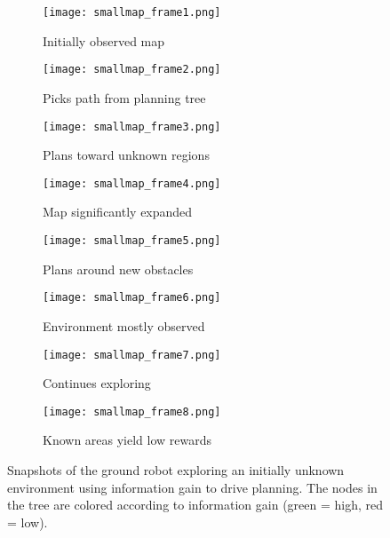 \begin{figure*}[t]
  \centering
	\begin{subfigure}{0.24\textwidth}
	\centering
	\texttt{[image: smallmap\_frame1.png]}
	\caption{Initially observed map\label{fig:smallmap_frame1}}
	\end{subfigure}
	\begin{subfigure}{0.24\textwidth}
	\centering
	\texttt{[image: smallmap\_frame2.png]}
	\caption{Picks path from planning tree\label{fig:smallmap_frame2}}
	\end{subfigure}
	\begin{subfigure}{0.24\textwidth}
	  \centering
	  \texttt{[image: smallmap\_frame3.png]}
	  \caption{Plans toward unknown regions\label{fig:smallmap_frame3}}
	\end{subfigure}
	\begin{subfigure}{0.24\textwidth}
	 \centering
	 \texttt{[image: smallmap\_frame4.png]}
	 \caption{Map significantly expanded \label{fig:smallmap_frame4}}
	\end{subfigure}
	
	\vspace*{0.1in}

	\begin{subfigure}{0.24\textwidth}
	\texttt{[image: smallmap\_frame5.png]}
	\caption{Plans around new obstacles\label{fig:smallmap_frame5}}
	\end{subfigure}
	\begin{subfigure}{0.24\textwidth}
	\texttt{[image: smallmap\_frame6.png]}
	\caption{Environment mostly observed\label{fig:smallmap_frame6}}
	\end{subfigure}
	\begin{subfigure}{0.24\textwidth}
	\centering
	\texttt{[image: smallmap\_frame7.png]}
	\caption{Continues exploring\label{fig:smallmap_frame7}}
	\end{subfigure}
	\begin{subfigure}{0.24\textwidth}
	\centering
	\texttt{[image: smallmap\_frame8.png]}
	\caption{Known areas yield low rewards\label{fig:smallmap_frame8}}
	\end{subfigure}
  \caption{Snapshots of the ground robot exploring an initially unknown environment using information gain to drive planning.  The nodes in the tree are colored according to information gain (green = high, red = low). \label{fig:smallmap_snapshots}}
\end{figure*}


